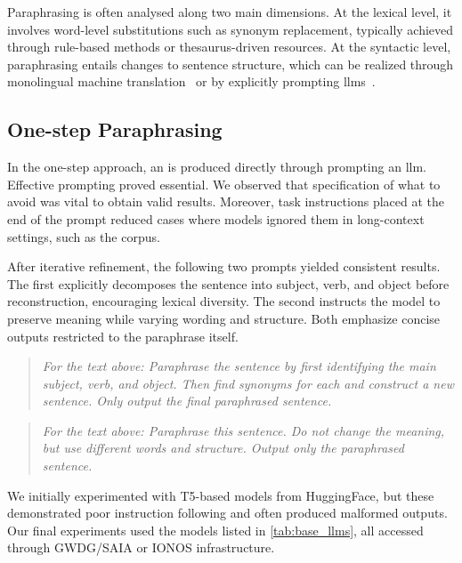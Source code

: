 Paraphrasing is often analysed along two main dimensions. 
At the lexical level, it involves word-level substitutions such as synonym replacement, typically achieved through rule-based methods or thesaurus-driven resources. 
At the syntactic level, paraphrasing entails changes to sentence structure, which can be realized through monolingual machine translation~\citep{zhou_paraphrase_2021} or by explicitly prompting \acp{llm}~\citep{kurt_pehlivanoglu_comparative_2024}.


\subsection{One-step Paraphrasing}

In the one-step approach, an \imp{} is produced directly through prompting an \ac{llm}. 
Effective prompting proved essential.
We observed that specification of what to avoid was vital to obtain valid results. 
Moreover, task instructions placed at the end of the prompt reduced cases where models ignored them in long-context settings, such as the \dataGutenberg{} corpus.

After iterative refinement, the following two prompts yielded consistent results.
The first explicitly decomposes the sentence into subject, verb, and object before reconstruction, encouraging lexical diversity. 
The second instructs the model to preserve meaning while varying wording and structure. 
Both emphasize concise outputs restricted to the paraphrase itself.

\begin{quote}
    \textit{For the text above: Paraphrase the sentence by first identifying the main subject, verb, and object. Then find synonyms for each and construct a new sentence. Only output the final paraphrased sentence.}
\end{quote}

\begin{quote}
    \textit{For the text above: Paraphrase this sentence. Do not change the meaning, but use different words and structure. Output only the paraphrased sentence.}
\end{quote}

We initially experimented with T5-based models from HuggingFace, but these demonstrated poor instruction following and often produced malformed outputs. 
Our final experiments used the models listed in \autoref{tab:base_llms}, all accessed through GWDG/SAIA or IONOS infrastructure.

